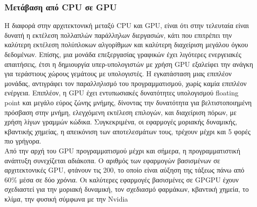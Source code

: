 \subsubsection{Μετάβαση από CPU σε GPU}
Η διαφορά στην αρχιτεκτονική μεταξύ CPU και GPU, είναι ότι στην τελευταία είναι δυνατή η εκτέλεση πολλαπλών παράλληλων διεργασιών, κάτι που επιτρέπει την καλύτερη εκτέλεση πολύπλοκων αλγορίθμων και καλύτερη διαχείριση μεγάλου όγκου δεδομένων. Επίσης, μια μονάδα επεξεργασίας γραφικών έχει λιγότερες ενεργειακές απαιτήσεις, έτσι η δημιουργία υπερ-υπολογιστών με χρήση GPU εξαλείφει την ανάγκη για τεράστιους χώρους γεμάτους με υπολογιστές. Η εγκατάσταση μιας επιπλέον μονάδας, αντιγράφει τον παραλληλισμό του προγραμματισμού, χωρίς καμία επιπλέον ενέργεια. Επιπλέον, η GPU έχει εντυπωσιακές δυνατότητες υπολογισμού floating point και μεγάλο εύρος ζώνης μνήμης, δίνοντας την δυνατότητα για βελτιστοποιημένη πρόσβαση στην μνήμη, ελεγχόμενη εκτέλεση επιλογών, και διαχείριση πόρων, με χρήση λίγων γραμμών κώδικα. Συγκεκριμένα, οι εφαρμογές μοριακής δυναμικής, κβαντικής χημείας, η απεικόνιση των αποτελεσμάτων τους, τρέχουν μέχρι και 5 φορές πιο γρήγορα. \\
Από την αρχή του GPU προγραμματισμού μέχρι και σήμερα, η προγραμματιστική ανάπτυξη συνεχίζεται αδιάκοπα. Ο αριθμός των εφαρμογών βασισμένων σε αρχιτεκτονικές GPU, φτάνουν τις 200, το οποίο είναι αύξηση της τάξεως πάνω από 60\% μέσα σε δύο χρόνια. Οι καλύτερες εφαρμογές βασισμένες σε GPGPU έχουν σχεδιαστεί για την μοριακή δυναμική, τον σχεδιασμό φαρμάκων, κβαντική χημεία, το κλίμα, την φυσική σύμφωνα με την Nvidia\cite{bioinformatics-2}

